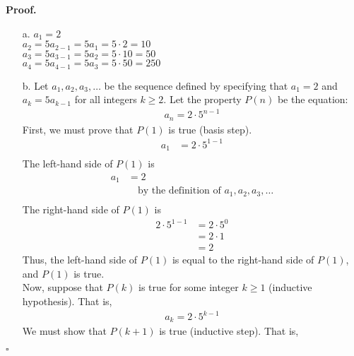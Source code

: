 \documentclass{article}
\newenvironment{proof}{
    \begin{mdframed}[nobreak=true, innerleftmargin=10pt, innerrightmargin=10pt, innertopmargin=10pt, innerbottommargin=10pt]
    \textbf{Proof.}
}{
    \hfill $\square$
    \end{mdframed}
}
\begin{document}
        \begin{proof}
            \begin{enumerate}
                \item[a.]
                    $a_1 = 2$ \\
                    $a_2 = 5a_{2-1} = 5a_1 = 5 \cdot 2 = 10$ \\
                    $a_3 = 5a_{3-1} = 5a_2 = 5 \cdot 10 = 50$ \\
                    $a_4 = 5a_{4-1} = 5a_3 = 5 \cdot 50 = 250$
                \item[b.]
                    Let $a_1, a_2, a_3, \ldots$ be the sequence defined by specifying that $a_1 = 2$ and $a_k = 5a_{k-1}$ for all integers $k \geq 2$. Let the property $P(n)$ be the equation:
                    \begin{align*}
                        a_n = 2 \cdot 5^{n-1}
                    \end{align*}
                    First, we must prove that $P(1)$ is true (basis step).
                    \begin{align*}
                        a_1 &= 2 \cdot 5^{1-1} \\
                    \end{align*}
                    The left-hand side of $P(1)$ is
                    \begin{align*}
                        a_1 &= 2 \\
                        & \quad \text{by the definition of $a_1, a_2, a_3, \ldots$} \\
                    \end{align*}
                    The right-hand side of $P(1)$ is
                    \begin{align*}
                        2 \cdot 5^{1-1} &= 2 \cdot 5^0 \\
                        &= 2 \cdot 1 \\
                        &= 2
                    \end{align*}
                    Thus, the left-hand side of $P(1)$ is equal to the right-hand side of $P(1)$, and $P(1)$ is true. \\
                    Now, suppose that $P(k)$ is true for some integer $k \geq 1$ (inductive hypothesis). That is,
                    \begin{align*}
                        a_k = 2 \cdot 5^{k-1}
                    \end{align*}
                    We must show that $P(k+1)$ is true (inductive step). That is,

\end{enumerate}
\end{proof}
\end{document}

